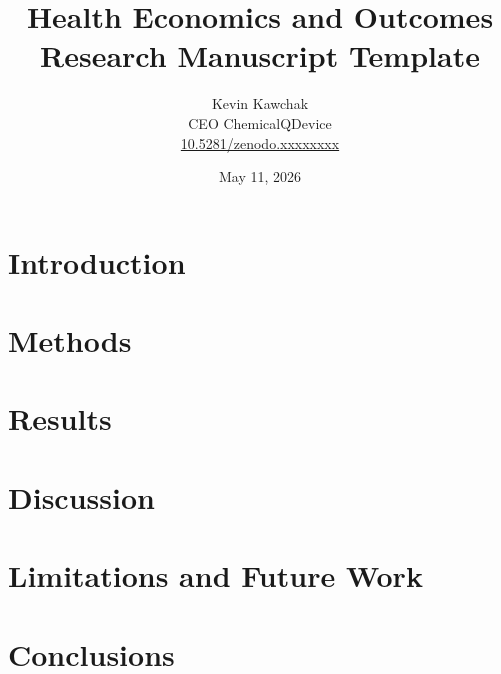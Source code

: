 \documentclass[11pt]{article}
\title{Health Economics and Outcomes Research Manuscript Template}
\author{
  Kevin Kawchak\hspace{2pt}\orcidicon{0009-0007-5457-8667} \\
  CEO ChemicalQDevice\\
  \href{https://doi.org/10.5281/zenodo.xxxxxxxx}{10.5281/zenodo.xxxxxxxx} \\
}
\date{May 11, 2026}
\begin{document}
\maketitle

\begin{abstract}

\end{abstract}

\keywords{ }

\vspace{-0.2cm}

\section{Introduction}
\label{sec:introduction}


\tableofcontents
\vspace{0.4cm}

\newpage
\section{Methods}
\label{sec:methods}

\newpage

\section{Results}
\label{sec:results}

\newpage

\section{Discussion}
\label{sec:discussion}


\section{Limitations and Future Work}
\label{sec:limitations}

\newpage

\section{Conclusions}
\label{sec:conclusions}

\newpage

{}
\begingroup
\raggedright


\endgroup
\newpage


\end{document}
